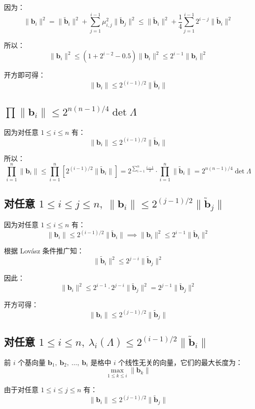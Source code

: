 \documentclass{article}
\begin{document}
因为：
\[ \|\bm{b}_i\|^2=\|\tilde{\bm{b}}_i\|^2+\sum_{j=1}^{i-1}\mu_{i,j}^2\|\tilde{\bm{b}}_j\|^2\leqslant\|\tilde{\bm{b}}_i\|^2+\dfrac{1}{4}\sum_{j=1}^{i-1}2^{i-j}\|\tilde{\bm{b}}_i\|^2 \]

所以：
\[ \|\bm{b}_i\|^2\leqslant(1+2^{i-2}-0.5)\|\bm{b}_i\|^2\leqslant2^{i-1}\|\bm{b}_i\|^2 \]

开方即可得：
\[ \|\bm{b}_i\|\leqslant2^{(i-1)/2}\|\tilde{\bm{b}}_i\| \]



\subsection{$\displaystyle\prod\|\bm{b}_i\|\leqslant2^{n(n-1)/4}\det\Lambda$}
因为对任意 $1\leqslant i\leqslant n$ 有：
\[ \|\bm{b}_i\|\leqslant2^{(i-1)/2}\|\tilde{\bm{b}}_i\| \]

所以：
\[ \prod_{i=1}^{n}\|\bm{b}_i\|\leqslant\prod_{i=1}^{n}\left[2^{(i-1)/2}\|\tilde{\bm{b}}_i\|\right]=2^{\sum\limits_{i=1}^{n}\tfrac{i-1}{2}}\cdot\prod_{i=1}^{n}\|\tilde{\bm{b}}_i\|=2^{n(n-1)/4}\det\Lambda \]



\subsection{对任意 $1\leqslant i\leqslant j\leqslant n,\ \|\bm{b}_i\|\leqslant2^{(j-1)/2}\|\tilde{\bm{b}}_j\|$}
因为对任意 $1\leqslant i\leqslant n$ 有：
\[ \|\bm{b}_i\|\leqslant2^{(i-1)/2}\|\tilde{\bm{b}}_i\|\implies\|\bm{b}_i\|^2\leqslant2^{i-1}\|\tilde{\bm{b}}_i\|^2 \]

根据 Lov\'asz 条件推广知：
\[ \|\tilde{\bm{b}}_i\|^2\leqslant2^{j-i}\|\tilde{\bm{b}}_j\|^2 \]

因此：
\[ \|\bm{b}_i\|^2\leqslant2^{i-1}\cdot2^{j-i}\|\tilde{\bm{b}}_j\|^2=2^{j-1}\|\tilde{\bm{b}}_j\|^2 \]

开方可得：
\[ \|\bm{b}_i\|\leqslant2^{(j-1)/2}\|\tilde{\bm{b}}_j\| \]



\subsection{对任意 $1\leqslant i\leqslant n,\ \lambda_i(\Lambda)\leqslant2^{(i-1)/2}\|\tilde{\bm{b}}_i\|$}
前 $i$ 个基向量 $\bm{b}_1,\ \bm{b}_2,\ \ldots,\ \bm{b}_i$ 是格中 $i$ 个线性无关的向量，它们的最大长度为：
\[ \max\limits_{1\leqslant k\leqslant i}\|\bm{b}_k\| \]

由于对任意 $1\leqslant i\leqslant j\leqslant n$ 有：
\[ \|\bm{b}_i\|\leqslant2^{(j-1)/2}\|\tilde{\bm{b}}_j\| \]
\end{document}
